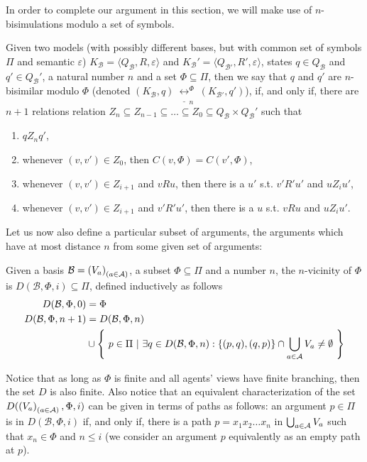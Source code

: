 \documentclass{llncs}
\newcommand{\carriers}[1]{Q_{#1}}
\newcommand{\basis}{basis }
\newcommand{\views}{\mathcal B}
\newcommand{\viewsv}{\left(V_a\right)_{(a \in \agents)}}
\newcommand{\carrier}{Q_\views}
\newcommand{\sem}{\varepsilon}
\newcommand{\bisim}{\underline{\leftrightarrow}}
\begin{document}
In order to complete our argument in this section, we will make use of $n$-bisimulations modulo a set of symbols.

\begin{definition}\label{def:bisim} Given two models (with possibly different bases, but with common set of symbols $\Pi$ and semantic $\sem$) $K_\views = \langle \carriers \views, R, \sem \rangle$ and $K_\views' = \langle \carriers {\views'}, R', \sem\rangle$, states $q \in \carrier$ and $q' \in \carrier'$, a natural number $n$ and a set $\Phi \subseteq \Pi$, then we say that $q$ and $q'$ are $n$-bisimilar modulo $\Phi$ (denoted $(K_\views, q) ~ \bisim_n^\Phi~ (K_{\views'}, q')$), if, and only if, there are $n+1$ relations relation $Z_n \subseteq Z_{n-1} \subseteq \dots \subseteq Z_0 \subseteq \carrier \times \carrier'$ such that
\begin{enumerate}
\item $q Z_n q'$, 
\item whenever $(v, v') \in Z_0$, then $C(v, \Phi) = C(v', \Phi)$, 
\item whenever $(v, v') \in Z_{i+1}$ and $vRu$, then there is a $u'$ s.t. $v'R'u'$ and $uZ_{i}u'$, 
\item whenever $(v, v') \in Z_{i+1}$ and $v'R'u'$, then there is a $u$ s.t. $vRu$ and $uZ_i u'$.
\end{enumerate}
\end{definition}

Let us now also define a particular subset of arguments, the arguments which have at most distance $n$ from some given set of arguments: 

\begin{definition}\label{def:vicinity}Given a \basis $\views = \viewsv$, a subset $\Phi \subseteq \Pi$ and a number $n$, the $n$-vicinity of $\Phi$ is $D(\views, \Phi, i) \subseteq \Pi$, defined inductively as follows
\begin{align*}
D(\views, \Phi, 0) &= \Phi \\
D(\views, \Phi, n+1) &= D(\views, \Phi, n) \\ 
&\cup \left\{~p \in \Pi ~|~ \exists q \in D(\views, \Phi, n): \{(p,q),(q,p)\} \cap \bigcup_{a \in \agents}V_a \not = \emptyset ~\right\}\\
\end{align*}
\end{definition}

Notice that as long as $\Phi$ is finite and all agents' views have finite branching, then the set $D$ is also finite. Also notice that an equivalent characterization of the set $D(\viewsv,\Phi,i)$ can be given in terms of paths as follows: an argument $p \in \Pi$ is in $D(\views,\Phi,i)$ if, and only if, there is a path $p=x_1x_2\ldots x_n$ in $\bigcup_{a \in \mathcal A}V_a$ such that $x_n \in \Phi$ and $n \leq i$ (we consider an argument $p$ equivalently as an empty path at $p$). 
\end{document}
